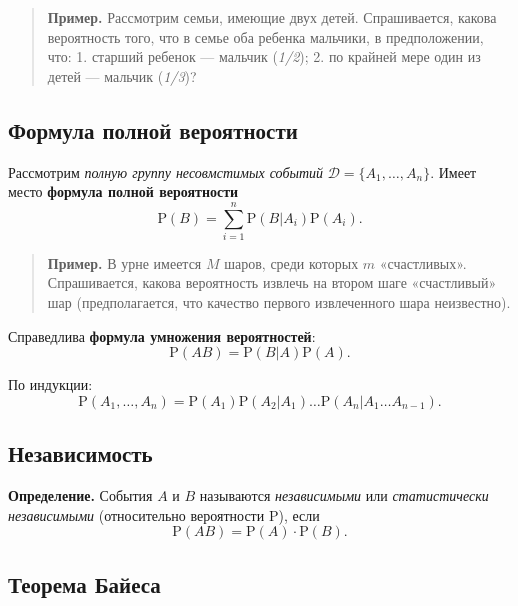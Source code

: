 \documentclass[11pt,a4paper]{article}
\begin{document}
\begin{quote}
\textbf{Пример.} Рассмотрим семьи, имеющие двух детей. Спрашивается,
какова вероятность того, что в семье оба ребенка мальчики, в
предположении, что: 1. старший ребенок --- мальчик (\emph{1/2}); 2. по
крайней мере один из детей --- мальчик (\emph{1/3})?
\end{quote}

    \hypertarget{ux444ux43eux440ux43cux443ux43bux430-ux43fux43eux43bux43dux43eux439-ux432ux435ux440ux43eux44fux442ux43dux43eux441ux442ux438}{%
\subsection{Формула полной
вероятности}\label{ux444ux43eux440ux43cux443ux43bux430-ux43fux43eux43bux43dux43eux439-ux432ux435ux440ux43eux44fux442ux43dux43eux441ux442ux438}}

Рассмотрим \emph{полную группу несовмстимых событий}
\(\mathcal{D} = \{A_1, \dots, A_n\}\). Имеет место \textbf{формула
полной вероятности}
\[ \mathrm{P}(B) = \sum_{i=1}^n \mathrm{P}(B|A_i) \mathrm{P}(A_i). \]

\begin{quote}
\textbf{Пример.} В урне имеется \(M\) шаров, среди которых \(m\)
«счастливых». Спрашивается, какова вероятность извлечь на втором шаге
«счастливый» шар (предполагается, что качество первого извлеченного шара
неизвестно).
\end{quote}

Справедлива \textbf{формула умножения вероятностей}:
\[ \mathrm{P}(AB) = \mathrm{P}(B|A) \mathrm{P}(A). \]

По индукции:
\[ \mathrm{P}(A_1, \dots, A_n) = \mathrm{P}(A_1) \mathrm{P}(A_2|A_1) \dots \mathrm{P}(A_n|A_1 \dots A_{n-1}). \]

    \hypertarget{ux43dux435ux437ux430ux432ux438ux441ux438ux43cux43eux441ux442ux44c}{%
\subsection{Независимость}\label{ux43dux435ux437ux430ux432ux438ux441ux438ux43cux43eux441ux442ux44c}}

\textbf{Определение.} События \(A\) и \(B\) называются
\emph{независимыми} или \emph{статистически независимыми} (относительно
вероятности \(\mathrm{P}\)), если
\[ \mathrm{P}(AB) = \mathrm{P}(A) \cdot \mathrm{P}(B). \]

    \hypertarget{ux442ux435ux43eux440ux435ux43cux430-ux431ux430ux439ux435ux441ux430}{%
\subsection{Теорема
Байеса}\label{ux442ux435ux43eux440ux435ux43cux430-ux431ux430ux439ux435ux441ux430}}
\end{document}
